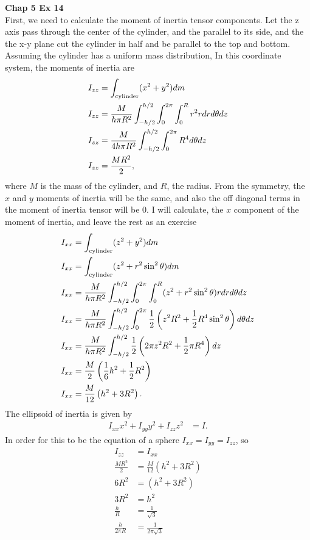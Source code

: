 \documentclass[10pt]{article}
\begin{document}
\textbf{Chap 5 Ex 14}\\
First, we need to calculate the moment of inertia tensor components.  Let the 
z axis pass through the center of the cylinder, and the parallel to its side,
and the the x-y plane cut the cylinder in half and be parallel to the top and
bottom.  Assuming the cylinder has a uniform mass distribution, 
In this coordinate system, the moments of inertia are
\begin{align*}
  I_{zz} &= \int_{\rm{cylinder}}(x^2+y^2)dm\\
  I_{zz} &= \frac{M}{h\pi R^2}\int_{-h/2}^{h/2}\int_{0}^{2\pi}\int_{0}^{R} r^2 rdrd\theta dz\\
  I_{zz} &= \frac{M}{4h\pi R^2}\int_{-h/2}^{h/2}\int_{0}^{2\pi} R^4 d\theta dz\\
  I_{zz} &= \frac{MR^2}{2},
\end{align*}
where $M$ is the mass of the cylinder, and $R$, the radius.  From the symmetry,
the $x$ and $y$ moments of inertia will be the same, and also the off diagonal
terms in the moment of inertia tensor will be 0.  I will calculate, the $x$
component of the moment of inertia, and leave the rest as an exercise
\begin{align*}
  I_{xx} &= \int_{\rm{cylinder}}(z^2+y^2)dm\\
  I_{xx} &= \int_{\rm{cylinder}}(z^2+r^2\sin^2\theta)dm\\
  I_{xx} &= \frac{M}{h\pi R^2}\int_{-h/2}^{h/2}\int_{0}^{2\pi}\int_{0}^{R} (z^2+r^2\sin^2\theta) rdrd\theta dz\\
  I_{xx} &= \frac{M}{h\pi R^2}\int_{-h/2}^{h/2}\int_{0}^{2\pi} \frac{1}{2}\left( z^2R^2+\frac{1}{2}R^4\sin^2\theta \right)d\theta dz\\
  I_{xx} &= \frac{M}{h\pi R^2}\int_{-h/2}^{h/2}\frac{1}{2}\left( 2\pi z^2R^2+\frac{1}{2}\pi R^4 \right) dz\\
  I_{xx} &= \frac{M}{2}\left( \frac{1}{6} h^2+\frac{1}{2} R^2 \right)\\
  I_{xx} &= \frac{M}{12}\left( h^2 + 3R^2 \right).
\end{align*}
The ellipsoid of inertia is given by
\begin{align*}
  I_{xx} x^2 + I_{yy} y^2 + I_{zz} z^2 &= I.
\end{align*}
In order for this to be the equation of a sphere $I_{xx}=I_{yy}=I_{zz}$, so
\begin{align*}
  I_{zz} &= I_{xx}\\
  \frac{MR^2}{2} &= \frac{M}{12}\left( h^2 + 3R^2 \right)\\
  6R^2 &= \left( h^2 + 3R^2 \right)\\
  3R^2 &= h^2\\
  \frac{h}{R} &= \frac{1}{\sqrt 3}\\
  \frac{h}{2\pi R} &= \frac{1}{2\pi\sqrt 3}
\end{align*}
\end{document}
